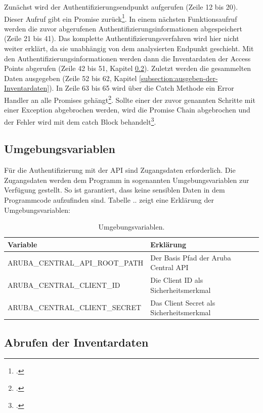 Zunächst wird der Authentifizierungsendpunkt aufgerufen (Zeile 12 bis 20). Dieser Aufruf gibt ein Promise zurück\footcite{zabriskie_axios_2021}. In einem nächsten Funktionsaufruf werden die zuvor abgerufenen Authentifizierungsinformationen abgespeichert (Zeile 21 bis 41). Das komplette Authentifizierungsverfahren wird hier nicht weiter erklärt, da sie unabhängig von dem analysierten Endpunkt geschieht. Mit den Authentifizierungsinformationen werden dann die Inventardaten der Access Points abgerufen (Zeile 42 bis 51, Kapitel \ref{subsection:abrufen-der-Inventardaten}). Zuletzt werden die gesammelten Daten ausgegeben (Zeile 52 bis 62, Kapitel \ref{subsection:ausgeben-der-Inventardaten}). In Zeile 63 bis 65 wird über die Catch Methode ein Error Handler an alle Promises gehängt\footcite[S. 772]{ecma_international_ecmascript_2021}. Sollte einer der zuvor genannten Schritte mit einer Exception abgebrochen werden, wird die Promise Chain abgebrochen und der Fehler wird mit dem catch Block behandelt\footcite{mozilla_foundation_using_2021}.

\subsection{Umgebungsvariablen}\label{subsection:Umgebungsvariablen}

Für die Authentifizierung mit der API sind Zugangsdaten erforderlich. Die Zugangsdaten werden dem Programm in sogenannten Umgebungsvariablen zur Verfügung gestellt. So ist garantiert, dass keine sensiblen Daten in dem Programmcode aufzufinden sind. Tabelle .. zeigt eine Erklärung der Umgebungsvariablen:


\begin{table}[htb]
\centering
\begin{tabular}{l|l}
    \textbf{Variable} & \textbf{Erklärung} \\
    \hline
    ARUBA\_CENTRAL\_API\_ROOT\_PATH & Der Basis Pfad der Aruba Central API \\
    \hline
    ARUBA\_CENTRAL\_CLIENT\_ID & Die Client ID als Sicherheitsmerkmal \\
    \hline
    ARUBA\_CENTRAL\_CLIENT\_SECRET & Das Client Secret als Sicherheitsmerkmal \\
\end{tabular}
\caption{Umgebungsvariablen.}
\label{tab:Umgebungsvariablen}
\end{table}

\subsection{Abrufen der Inventardaten}\label{subsection:abrufen-der-Inventardaten}

